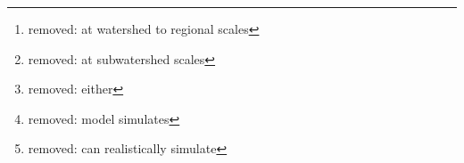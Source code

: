 \documentclass[gmd, manuscript]{copernicus}
\providecommand{\DIFadd}[1]{{\protect\color{blue} \sf #1}} %
\providecommand{\DIFdel}[1]{{\protect\color{red} [..\footnote{removed: #1} ]}} %
\providecommand{\DIFaddbegin}{} %
\providecommand{\DIFaddend}{} %
\providecommand{\DIFdelbegin}{} %
\providecommand{\DIFdelend}{} %
\begin{document}
\begin{abstract}
While there are numerical landscape evolution models
that simulate how steady state flows of water and sediment
reshape topography over long periods of time, 
r.sim.terrain is the first to 
simulate short-term topographic change 
for both steady state and dynamic flow regimes
across a range of spatial scales.
This free and open source, 
GIS-based topographic evolution model
uses empirical models for soil erosion
\DIFdelbegin \DIFdel{at watershed to regional scales 
}\DIFdelend and a physics-based model
for shallow overland water flow and soil erosion 
\DIFdelbegin \DIFdel{at subwatershed scales
}\DIFdelend to compute short-term topographic change. 
This \DIFdelbegin \DIFdel{either }\DIFdelend \DIFaddbegin \DIFadd{model uses either a }\DIFaddend steady state or dynamic \DIFdelbegin \DIFdel{model simulates
}\DIFdelend \DIFaddbegin \DIFadd{representation of overland flow
to simulate }\DIFaddend how overland sediment mass flows reshape topography
for a range of hydrologic soil erosion regimes
based on topographic, land cover, soil, and rainfall parameters. 
As demonstrated by a case study 
for Patterson Branch subwatershed
on the Fort Bragg military installation in North Carolina,
r.sim.terrain \DIFdelbegin \DIFdel{can realistically simulate }\DIFdelend \DIFaddbegin \DIFadd{simulates }\DIFaddend the development of 
fine-scale morphological features including 
ephemeral gullies, rills, and hillslopes.
Applications include land management, erosion control,
landscape planning, and landscape restoration. 
\end{abstract}


\end{document}
